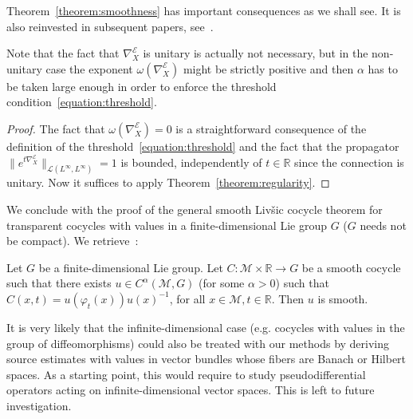 \documentclass[AHL,Unicode,longabstracts,published]{cedram}
\newcommand{\R}{\mathbb{R}}
\newcommand{\mc}{\mathcal}
\newcommand{\M}{\mathcal{M}}
\newcommand{\E}{\mathcal{E}}
\begin{document}
Theorem~\ref{theorem:smoothness} has important consequences as we shall see. It is also reinvested in subsequent papers, see~\cite{Cekic-Lefeuvre-21-1, Cekic-Lefeuvre-21-2}.

\begin{rema}
Note that the fact that $\nabla^{\E}_X$ is unitary is actually not necessary, but in the non-unitary case the exponent $\omega(\nabla^{\E}_X)$ might be strictly positive and then $\alpha$ has to be taken large enough in order to enforce the threshold condition~\eqref{equation:threshold}.
\end{rema}

\begin{proof}
The fact that $\omega(\nabla^{\E}_X) = 0$ is a straightforward consequence of the definition of the threshold~\eqref{equation:threshold} and the fact that the propagator $\|e^{t\nabla^{\E}_X}\|_{\mc{L}(L^\infty,L^\infty)} = 1$ is bounded, independently of $t \in \R$ since the connection is unitary. Now it suffices to apply Theorem~\ref{theorem:regularity}.
\end{proof}



We conclude with the proof of the general smooth Liv{\v s}ic cocycle theorem for transparent cocycles with values in a finite-dimensional Lie group $G$ ($G$ needs not be compact). We retrieve~\cite[Theorem~2.4]{Nitica-Torok-98}:

\begin{theo}\label{theorem:nt}
Let $G$ be a finite-dimensional Lie group. Let $C : \M \times \R \rightarrow G$ be a smooth cocycle such that there exists $u \in C^\alpha(\M,G)$ (for some $\alpha > 0$) such that $C(x,t)=u(\varphi_t(x))u(x)^{-1}$, for all $x \in \M, t \in \R$. Then $u$ is smooth.
\end{theo}

\begin{rema}
It is very likely that the infinite-dimensional case (e.g. cocycles with values in the group of diffeomorphisms) could also be treated with our methods by deriving source estimates with values in vector bundles whose fibers are Banach or Hilbert spaces. As a starting point, this would require to study pseudodifferential operators acting on infinite-dimensional vector spaces. This is left to future investigation.
\end{rema}
\end{document}
